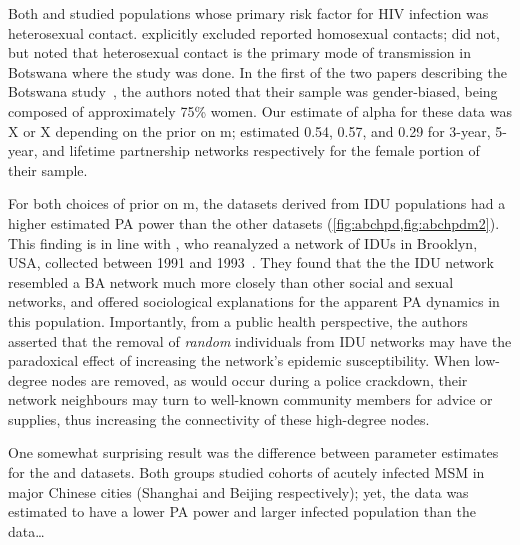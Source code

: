Both \textcite{de2007preferential} and \textcite{novitsky2014impact} studied
populations whose primary risk factor for \gls{HIV} infection was heterosexual
contact. \citeauthor{de2007preferential} explicitly excluded reported
homosexual contacts; \citeauthor{novitsky2014impact} did not, but noted that
heterosexual contact is the primary mode of transmission in Botswana where the
study was done. In the first of the two papers describing the Botswana
study~\autocite{novitsky2013phylogenetic}, the authors noted that their sample
was gender-biased, being composed of approximately 75\% women. Our estimate of
\gls{alpha} for these data was 
    X%
        or 
    X%
depending on the prior on \gls{m}; \citeauthor{de2007preferential} estimated
0.54, 0.57, and 0.29 for 3-year, 5-year, and lifetime partnership networks
respectively for the female portion of their sample.

For both choices of prior on \gls{m}, the datasets derived from \gls{IDU}
populations had a higher estimated \acrlong{PA} power than the other datasets
(\cref{fig:abchpd,fig:abchpdm2}). This finding is in line with
\textcite{dombrowski2013topological}, who reanalyzed a network of \glspl{IDU}
in Brooklyn, USA, collected between 1991 and
1993~\autocite{friedman2006social}. They found that the the \gls{IDU} network 
resembled a \gls{BA} network much more closely than other social and sexual 
networks, and offered sociological explanations for the apparent \acrlong{PA}
dynamics in this population. Importantly, from a public health perspective,
the authors asserted that the removal of \emph{random} individuals from
\gls{IDU} networks may have the paradoxical effect of increasing the network's
epidemic susceptibility. When low-degree nodes are removed, as would occur
during a police crackdown, their network neighbours may turn to well-known
community members for advice or supplies, thus increasing the connectivity of
these high-degree nodes.

One somewhat surprising result was the difference between parameter estimates 
for the \textcite{li2015hiv} and \textcite{wang2015targeting} datasets. Both
groups studied cohorts of acutely infected \gls{MSM} in major Chinese cities
(Shanghai and Beijing respectively); yet, the \citeauthor{li2015hiv} data was 
estimated to have a lower \acrlong{PA} power and larger infected population
than the \textcite{wang2015targeting} data\ldots

